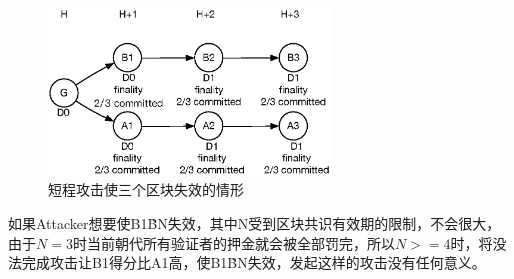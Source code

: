 \begin{figure}[h]
\centering
\includegraphics[width=7.5cm]{./figs/revert3}
\caption{短程攻击使三个区块失效的情形}
\label{fig:revert3}
\end{figure}

如果Attacker想要使B1\~BN失效，其中N受到区块共识有效期的限制，不会很大，由于$N=3$时当前朝代所有验证者的押金就会被全部罚完，所以$N>=4$时，将没法完成攻击让B1得分比A1高，使B1\~BN失效，发起这样的攻击没有任何意义。

